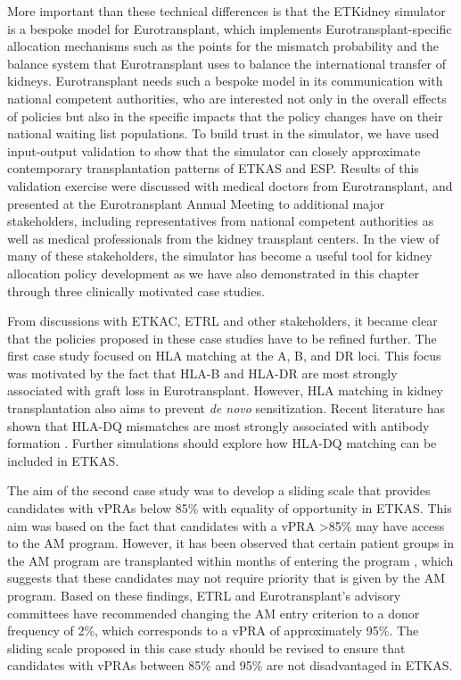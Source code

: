\documentclass[11pt,twoside,]{book}
\begin{document}
More important than these technical differences is that the ETKidney
simulator is a bespoke model for Eurotransplant, which implements
Eurotransplant-specific allocation mechanisms such as the points for the mismatch
probability and the balance system that Eurotransplant uses to balance the
international transfer of kidneys. Eurotransplant needs such a
bespoke model in its communication with national competent authorities, who
are interested not only in the overall effects of policies but also in
the specific impacts that the policy changes have on their national waiting list populations.
\newpage
To build trust in the simulator, we have used input-output validation to
show that the simulator can closely approximate contemporary
transplantation patterns of ETKAS and ESP. Results of this validation
exercise were discussed with medical doctors from Eurotransplant, and
presented at the Eurotransplant Annual Meeting to additional major
stakeholders, including representatives from national competent authorities
as well as medical professionals from the kidney transplant centers. In
the view of many of these stakeholders, the simulator has become a useful
tool for kidney allocation policy development as we have also demonstrated in this
chapter through three clinically motivated case studies.

From discussions with ETKAC, ETRL and other stakeholders, it became
clear that the policies proposed in these case studies have to be refined further. The
first case study focused on HLA matching at the A, B, and DR
loci. This focus was motivated by the fact that HLA-B
and HLA-DR are most strongly associated with graft loss in Eurotransplant. However,
HLA matching in kidney transplantation also aims to prevent \emph{de novo}
sensitization. Recent literature has shown that HLA-DQ mismatches are most
strongly associated with antibody formation \citep{Tambur2021, Isaacson2022}.
Further simulations should explore how HLA-DQ matching can be included in ETKAS.

The aim of the second case study was to develop a sliding scale
that provides
candidates with vPRAs below 85\% with equality of opportunity in ETKAS. This aim was based on the fact that candidates with a
vPRA \textgreater85\% may have access to the AM program. However, it has
been observed that certain patient groups in the AM program are
transplanted within months of entering the program \citep{Heidt2015}, which
suggests that these candidates may not require priority that is given by the
AM program.
Based on these findings, ETRL and Eurotransplant's advisory committees have
recommended changing the AM entry criterion to a donor frequency of 2\%, which
corresponds to a vPRA of approximately 95\%. The sliding scale proposed in this case study should be revised to ensure that candidates with vPRAs between 85\% and
95\% are not disadvantaged in ETKAS.
\end{document}
